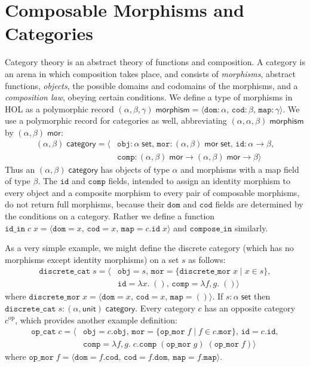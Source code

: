 \documentclass[twoside,titlepage,11pt]{article}
\begin{document}
\section{Composable Morphisms and Categories}%
Category theory is an abstract theory of functions and composition.
A category is an arena in which composition takes place, and consists of \emph{morphisms}, abstract functions, \emph{objects}, the possible domains and codomains of the morphisms, and a \emph{composition law}, obeying certain conditions.
We define a type of morphisms in HOL as a polymorphic record $(\alpha,\beta,\gamma)\;\mathsf{morphism}=\langle\mathtt{dom}:\alpha,\,\mathtt{cod}:\beta,\,\mathtt{map}:\gamma\rangle$.
We use a polymorphic record for categories as well, abbreviating $(\alpha,\alpha,\beta)\;\mathsf{morphism}$ by $(\alpha,\beta)\;\mathsf{mor}$:
\begin{align*}
(\alpha,\beta)\;\mathsf{category}=\langle&\mathtt{obj}:\alpha\;\mathsf{set},\,\mathtt{mor}:(\alpha,\beta)\;\mathsf{mor}\;\mathsf{set},\,\mathtt{id}:\alpha\to\beta,\\&\mathtt{comp}:(\alpha,\beta)\;\mathsf{mor}\to(\alpha,\beta)\;\mathsf{mor}\to\beta\rangle
\end{align*}
Thus an $(\alpha,\beta)\;\mathsf{category}$ has objects of type $\alpha$ and morphisms with a map field of type $\beta$.
The $\mathtt{id}$ and $\mathtt{comp}$ fields, intended to assign an identity morphism to every object and a composite morphism to every pair of composable morphisms, do not return full morphisms, because their $\mathtt{dom}$ and $\mathtt{cod}$ fields are determined by the conditions on a category.
Rather we define a function $\mathtt{id\_in}\;c\;x=\langle\mathtt{dom}=x,\,\mathtt{cod}=x,\,\mathtt{map}=c.\mathtt{id}\;x\rangle$ and $\mathtt{compose\_in}$ similarly.

As a very simple example, we might define the discrete category (which has no morphisms except identity morphisms) on a set $s$ as follows:
\begin{align*}
\mathtt{discrete\_cat}\;s=\langle&\mathtt{obj}=s,\,\mathtt{mor}=\{\mathtt{discrete\_mor}\;x\mid x\in s\},\\&\mathtt{id}=\lambda{x}.\;(),\,\mathtt{comp}=\lambda{f,g}.\;()\rangle
\end{align*}
where $\mathtt{discrete\_mor}\;x=\langle\mathtt{dom}=x,\,\mathtt{cod}=x,\,\mathtt{map}=()\rangle$.
If $s:\alpha\;\mathsf{set}$ then $\mathtt{discrete\_cat}\;s:(\alpha,\mathsf{unit})\;\mathsf{category}$.
Every category $c$ has an opposite category $c^{\mathrm{op}}$, which provides another example definition:
\begin{align*}
\mathtt{op\_cat}\;c=\langle&\mathtt{obj}=c.\mathtt{obj},\,\mathtt{mor}=\{\mathtt{op\_mor}\;f\mid f\in c.\mathtt{mor}\},\,\mathtt{id}=c.\mathtt{id},\\&\mathtt{comp}=\lambda{f,g}.\;c.\mathtt{comp}\;(\mathtt{op\_mor}\;g)\;(\mathtt{op\_mor}\;f)\rangle
\end{align*}
where $\mathtt{op\_mor}\;f=\langle\mathtt{dom}=f.\mathtt{cod},\,\mathtt{cod}=f.\mathtt{dom},\,\mathtt{map}=f.\mathtt{map}\rangle$.
\end{document}

